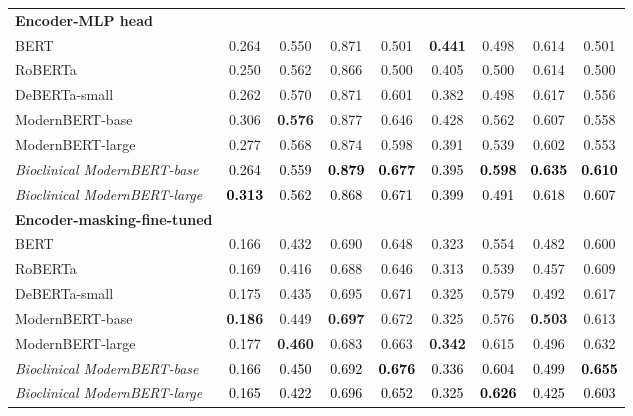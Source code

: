 \begin{table}[htbp]
\begin{ChSevenFloatBody}
{\begin{tabular}{lcccccccc}
\midrule
\textbf{Encoder-MLP head} &&&&&&&&\\
BERT & 0.264 & 0.550 & 0.871 & 0.501 & \textbf{0.441} & 0.498 & 0.614 & 0.501 \\
RoBERTa & 0.250 & 0.562 & 0.866 & 0.500 & 0.405 & 0.500 & 0.614 & 0.500 \\
DeBERTa-small & 0.262 & 0.570 & 0.871 & 0.601 & 0.382 & 0.498 & 0.617 & 0.556 \\
ModernBERT-base & 0.306 & \textbf{0.576} & 0.877 & 0.646 & 0.428 & 0.562 & 0.607 & 0.558 \\
ModernBERT-large & 0.277 & 0.568 & 0.874 & 0.598 & 0.391 & 0.539 & 0.602 & 0.553 \\
\textit{Bioclinical ModernBERT-base} & \textcolor{black}{0.264} & \textcolor{black}{0.559} & \textcolor{black}{\textbf{0.879}} & \textcolor{black}{\textbf{0.677}} & \textcolor{black}{0.395} & \textcolor{black}{\textbf{0.598}} & \textcolor{black}{\textbf{0.635}} & \textcolor{black}{\textbf{0.610}} \\
\textit{Bioclinical ModernBERT-large} & \textcolor{black}{\textbf{0.313}} & \textcolor{black}{0.562} & \textcolor{black}{0.868} & \textcolor{black}{0.671} & \textcolor{black}{0.399} & \textcolor{black}{0.491} & \textcolor{black}{0.618} & \textcolor{black}{0.607} \\
\midrule
\textbf{Encoder-masking-fine-tuned} &&&&&&&&\\
BERT & 0.166 & 0.432 & 0.690 & 0.648 & 0.323 & 0.554 & 0.482 & 0.600 \\
RoBERTa & 0.169 & 0.416 & 0.688 & 0.646 & 0.313 & 0.539 & 0.457 & 0.609 \\
DeBERTa-small & 0.175 & 0.435 & 0.695 & 0.671 & 0.325 & 0.579 & 0.492 & 0.617 \\
ModernBERT-base & \textbf{0.186} & 0.449 & \textbf{0.697} & 0.672 & 0.325 & 0.576 & \textbf{0.503} & 0.613 \\
ModernBERT-large & 0.177 & \textbf{0.460} & 0.683 & 0.663 & \textbf{0.342} & 0.615 & 0.496 & 0.632 \\
\textit{Bioclinical ModernBERT-base} & \textcolor{black}{0.166} & \textcolor{black}{0.450} & \textcolor{black}{0.692} & \textcolor{black}{\textbf{0.676}} & \textcolor{black}{0.336} & \textcolor{black}{0.604} & \textcolor{black}{0.499} & \textcolor{black}{\textbf{0.655}} \\
\textit{Bioclinical ModernBERT-large} & \textcolor{black}{0.165} & \textcolor{black}{0.422} & \textcolor{black}{0.696} & \textcolor{black}{0.652} & \textcolor{black}{0.325} & \textcolor{black}{\textbf{0.626}} & \textcolor{black}{0.425} & \textcolor{black}{0.603} \\

\end{tabular}}
\end{ChSevenFloatBody}
\end{table}
